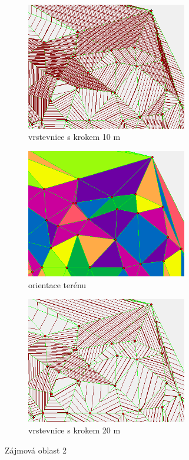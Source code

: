 \begin{figure}[H]
\begin{subfigure}{.475\linewidth}
\centering
  \includegraphics[width=7cm]{images/case2m.png}
  \caption{vrstevnice s krokem 10 m}
  \label{MLEDdet}
\end{subfigure}\hfill %
\medskip
\begin{subfigure}{.475\linewidth}
\centering
  \includegraphics[width=7cm]{images/case2a.png}
  \caption{orientace terénu}
  \label{velcomp}
\end{subfigure}\hfill %
\begin{subfigure}{.475\linewidth}
\centering
  \includegraphics[width=7cm]{images/case2m20.png}
  \caption{vrstevnice s krokem 20 m}
  \label{estcomp}
\end{subfigure}

\caption{Zájmová oblast 2}
\label{fig:roc}
\end{figure}

